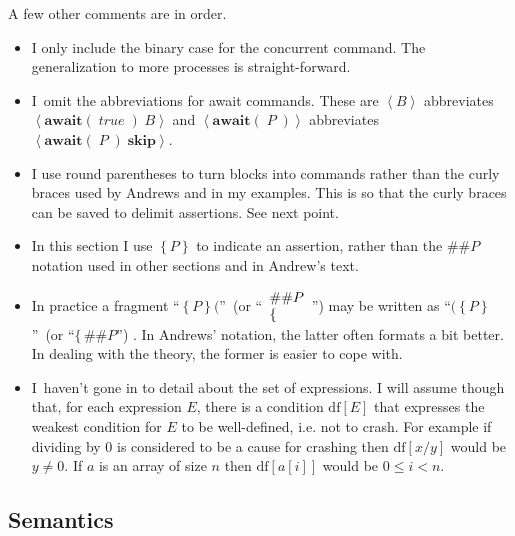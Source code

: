 \documentclass[muchmore,11pt]{article}%
\begin{document}
A few other comments are in order.

\begin{itemize}
\item I only include the binary case for the concurrent command. The
generalization to more processes is straight-forward.

\item I\ omit the abbreviations for await commands. These are $\left\langle
B\right\rangle $ abbreviates $\left\langle \mathbf{await}(\;\mathit{true}%
\;)\;B\right\rangle $ and $\left\langle \mathbf{await}(\;P\;)\right\rangle $
abbreviates $\left\langle \mathbf{await}(\;P\;)\;\mathbf{skip}\right\rangle $.

\item I use round parentheses to turn blocks into commands rather than the
curly braces used by Andrews and in my examples. This is so that the curly
braces can be saved to delimit assertions. See next point.

\item In this section I use $\left\{  P\right\}  $ to indicate an assertion,
rather than the $\#\#P$ notation used in other sections and in Andrew's text.

\item In practice a fragment \textquotedblleft$\left\{  P\right\}
($\textquotedblright\ (or \textquotedblleft$%
\begin{array}
[c]{l}%
{\small \#\#P}\\
{\small \{}%
\end{array}
$\textquotedblright) may be written as \textquotedblleft$(\left\{  P\right\}
$\textquotedblright\ (or \textquotedblleft$\{\,\#\#P$\textquotedblright) . In
Andrews' notation, the latter often formats a bit better. In dealing with the
theory, the former is easier to cope with.

\item I\ haven't gone in to detail about the set of expressions. I will assume
though that, for each expression $E$, there is a condition $\mathrm{df}[E]$
that expresses the weakest condition for $E$ to be well-defined, i.e. not to
crash. For example if dividing by $0$ is considered to be a cause for crashing
then $\mathrm{df}[x/y]$ would be $y\neq0$. If $a$ is an array of size $n$ then
$\mathrm{df}[a[i]]$ would be $0\leq i<n$.
\end{itemize}

\subsection{Semantics}
\end{document}
